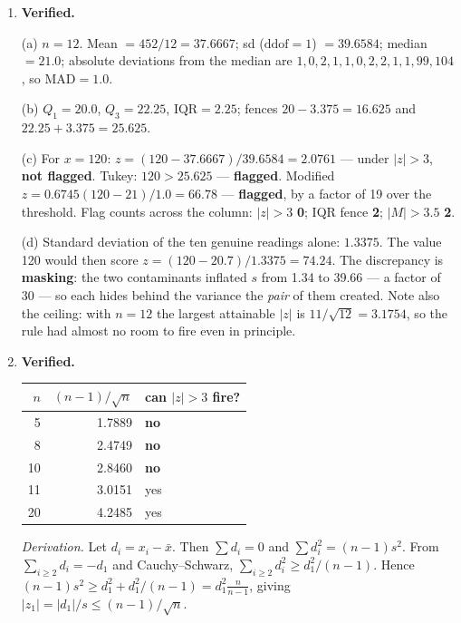 \documentclass[11pt,a4paper]{article}
\newcommand{\A}[1]{\item[\textbf{#1}]}
\begin{document}
\begin{enumerate}[leftmargin=1.9cm]
\A{U4.56} \textbf{Verified.}
\begin{answerbox}
(a) $n = 12$. Mean $= 452/12 = \mathbf{37.6667}$;
sd ($\text{ddof}{=}1$) $= \mathbf{39.6584}$; median $= \mathbf{21.0}$;
absolute deviations from the median are $1,0,2,1,1,0,2,2,1,1,99,104$, so
$\text{MAD} = \mathbf{1.0}$.

(b) $Q_1 = \mathbf{20.0}$, $Q_3 = \mathbf{22.25}$, $\text{IQR} = \mathbf{2.25}$;
fences $20 - 3.375 = \mathbf{16.625}$ and $22.25 + 3.375 = \mathbf{25.625}$.

(c) For $x = 120$: $z = (120 - 37.6667)/39.6584 = \mathbf{2.0761}$ --- under
$|z|>3$, \textbf{not flagged}. Tukey: $120 > 25.625$ --- \textbf{flagged}.
Modified $z = 0.6745(120-21)/1.0 = \mathbf{66.78}$ --- \textbf{flagged}, by a
factor of 19 over the threshold.
Flag counts across the column: $|z|>3$ \textbf{0}; IQR fence \textbf{2};
$|M|>3.5$ \textbf{2}.

(d) Standard deviation of the ten genuine readings alone: $\mathbf{1.3375}$.
The value 120 would then score $z = (120-20.7)/1.3375 = \mathbf{74.24}$.
The discrepancy is \textbf{masking}: the two contaminants inflated $s$ from
1.34 to 39.66 --- a factor of 30 --- so each hides behind the variance the
\emph{pair} of them created. Note also the ceiling: with $n = 12$ the largest
attainable $|z|$ is $11/\sqrt{12} = 3.1754$, so the rule had almost no room to
fire even in principle.
\end{answerbox}

\A{U4.57} \textbf{Verified.}
\begin{answerbox}
\begin{center}\begin{tabular}{@{}rrl@{}}\toprule
$n$ & $(n-1)/\sqrt n$ & can $|z|>3$ fire?\\
\midrule
5 & 1.7889 & \textbf{no}\\ 8 & 2.4749 & \textbf{no}\\ 10 & 2.8460 & \textbf{no}\\
11 & 3.0151 & yes\\ 20 & 4.2485 & yes\\
\bottomrule\end{tabular}\end{center}
\emph{Derivation.} Let $d_i = x_i - \bar x$. Then $\sum d_i = 0$ and
$\sum d_i^2 = (n-1)s^2$. From $\sum_{i\ge2} d_i = -d_1$ and Cauchy--Schwarz,
$\sum_{i\ge2} d_i^2 \ge d_1^2/(n-1)$. Hence
$(n-1)s^2 \ge d_1^2 + d_1^2/(n-1) = d_1^2\frac{n}{n-1}$, giving
$|z_1| = |d_1|/s \le (n-1)/\sqrt n$.


\end{answerbox}
\end{enumerate}
\end{document}

